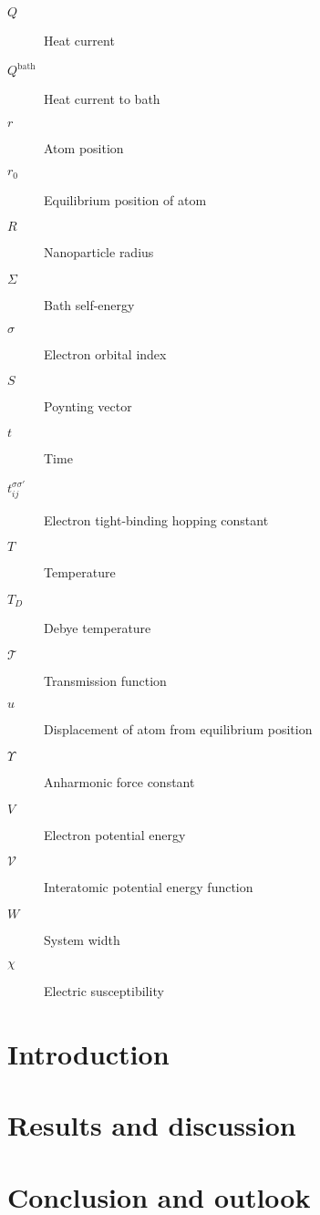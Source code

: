 \documentclass[dissertation]{aaltoseries}
\newcommand{\bb}{\mathbf}
\newcommand{\bu}{\bb{u}}
\begin{document}
\begin{description}
  \item[$Q$] Heat current
  \item[$Q^{\textrm{bath}}$] Heat current to bath
  \item[$r$] Atom position
  \item[$r_0$] Equilibrium position of atom 
  \item[$R$] Nanoparticle radius
   \item[$\Sigma$] Bath self-energy
  \item[$\sigma$] Electron orbital index
  \item[$S$] Poynting vector
  \item[$t$] Time
  \item[$t_{ij}^{\sigma\sigma'}$] Electron tight-binding hopping constant
  \item[$T$] Temperature
  \item[$T_D$] Debye temperature
  \item[$\mathcal{T}$] Transmission function
  \item[$u$] Displacement of atom from equilibrium position
  \item[$\Upsilon$] Anharmonic force constant
  \item[${V}$] Electron potential energy
  \item[$\mathcal{V}$] Interatomic potential energy function
  \item[$W$] System width
  \item[$\chi$] Electric susceptibility
\end{description}

\chapter{Introduction}
\setcounter{page}{1}




\chapter{Results and discussion}




\chapter{Conclusion and outlook}
\end{document}
